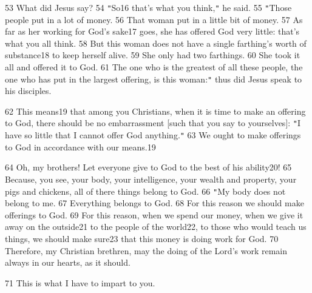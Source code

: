 53 What did Jesus say? 54 \texttt{"}So16 that's what you think,\texttt{"} he said.
55 \texttt{"}Those people put in a lot of money. 56 That woman put in a little
bit of money. 57 As far as her working for God's sake17 goes, she has offered God
very little: that's what you all think. 58 But this woman does not have a single
farthing's worth of substance18 to keep herself alive. 59 She only had two farthings.
60 She took it all and offered it to God. 61 The one who is the greatest of all
these people, the one who has put in the largest offering, is this woman:\texttt{"}
thus did Jesus speak to his disciples.

62 This means19 that among you Christians, when it is time to make an offering
to God, there should be no embarrassment [such that you say to yourselves]: \texttt{"}I
have so little that I cannot offer God anything.\texttt{"} 63 We ought to make
offerings to God in accordance with our means.19

64 Oh, my brothers! Let everyone give to God to the best of his ability20! 65 Because,
you see, your body, your intelligence, your wealth and property, your pigs and
chickens, all of there things belong to God. 66 \texttt{"}My body does not belong
to me. 67 Everything belongs to God. 68 For this reason we should make offerings
to God. 69 For this reason, when we spend our money, when we give it away on the
outside21 to the people of the world22, to those who would teach us things, we
should make sure23 that this money is doing work for God. 70 Therefore, my Christian
brethren, may the doing of the Lord's work remain always in our hearts, as it should.

71 This is what I have to impart to you.

